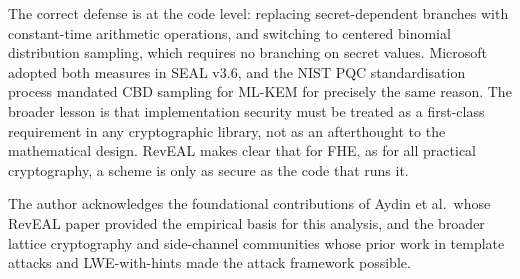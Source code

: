 \documentclass[sigconf,nonacm]{acmart}
\begin{document}
The correct defense is at the code level: replacing secret-dependent branches with
constant-time arithmetic operations, and switching to centered binomial distribution
sampling, which requires no branching on secret values. Microsoft adopted both
measures in SEAL v3.6, and the NIST PQC standardisation process mandated CBD sampling
for ML-KEM for precisely the same reason. The broader lesson is that implementation
security must be treated as a first-class requirement in any cryptographic library,
not as an afterthought to the mathematical design. RevEAL makes clear that for FHE,
as for all practical cryptography, a scheme is only as secure as the code that runs it.

\begin{acks}
The author acknowledges the foundational contributions of Aydin et al.\ whose RevEAL
paper provided the empirical basis for this analysis, and the broader lattice
cryptography and side-channel communities whose prior work in template attacks and
LWE-with-hints made the attack framework possible.
\end{acks}
\end{document}
